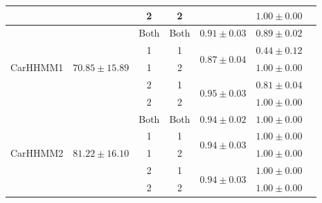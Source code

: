 \begin{table}
{\begin{tabular}{ccccccc}
                           &                                    & 2                             & 2                                &                                   & $1.00 \pm 0.00$                       \\ \hline
\multirow{5}{*}{CarHHMM1}  & \multirow{5}{*}{$70.85 \pm 15.89$}   & Both                          & Both                             & $0.91 \pm 0.03$                   & $0.89 \pm 0.02$                       \\
                           &                                    & 1                             & 1                                & \multirow{2}{*}{$0.87\pm0.04$}    & $0.44 \pm 0.12$                       \\ 
                           &                                    & 1                             & 2                                &                                   & $1.00 \pm 0.00$                       \\ 
                           &                                    & 2                             & 1                                & \multirow{2}{*}{$0.95\pm0.03$}    & $0.81 \pm 0.04$                       \\ 
                           &                                    & 2                             & 2                                &                                   & $1.00 \pm 0.00$                       \\ \hline
\multirow{5}{*}{CarHHMM2}  & \multirow{5}{*}{$81.22 \pm 16.10$}   & Both                          & Both                             & $0.94 \pm 0.02$                   & $1.00 \pm 0.00$                       \\
                           &                                    & 1                             & 1                                & \multirow{2}{*}{$0.94\pm0.03$}    & $1.00 \pm 0.00$                       \\ 
                           &                                    & 1                             & 2                                &                                   & $1.00 \pm 0.00$                       \\ 
                           &                                    & 2                             & 1                                & \multirow{2}{*}{$0.94\pm0.03$}    & $1.00 \pm 0.00$                       \\ 
                           &                                    & 2                             & 2                                &                                   & $1.00 \pm 0.00$                       \\ \hline
\end{tabular}
}
\label{table:accuracy}
\end{table}

